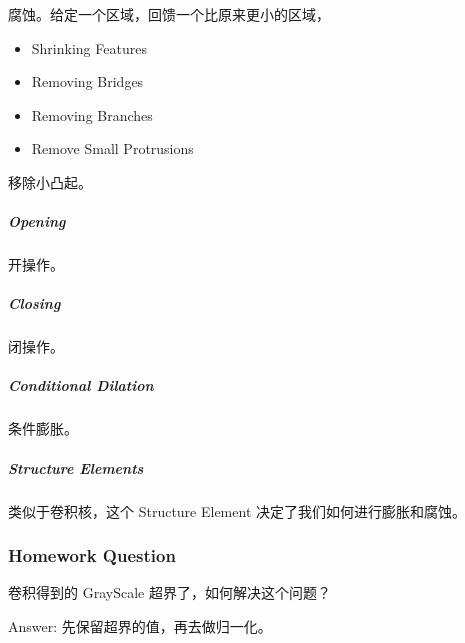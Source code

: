 \documentclass[
]{article}
\begin{document}
腐蚀。给定一个区域，回馈一个比原来更小的区域，

\begin{itemize}
\item
  Shrinking Features
\item
  Removing Bridges
\item
  Removing Branches
\item
  Remove Small Protrusions
\end{itemize}

移除小凸起。

\hypertarget{header-n122}{%
\subparagraph{Opening}\label{header-n122}}

开操作。

\hypertarget{header-n124}{%
\subparagraph{Closing}\label{header-n124}}

闭操作。

\hypertarget{header-n126}{%
\subparagraph{Conditional Dilation}\label{header-n126}}

条件膨胀。

\hypertarget{header-n128}{%
\subparagraph{Structure Elements}\label{header-n128}}

类似于卷积核，这个 Structure Element 决定了我们如何进行膨胀和腐蚀。

\hypertarget{header-n130}{%
\subsubsection{Homework Question}\label{header-n130}}

卷积得到的 GrayScale 超界了，如何解决这个问题？

Answer: 先保留超界的值，再去做归一化。
\end{document}
